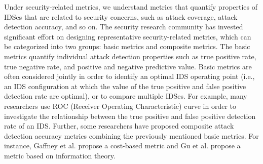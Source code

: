 Under security-related metrics, we understand metrics that quantify properties of IDSes that are related to security concerns, such as attack coverage, attack detection accuracy, and so on. The security research community has invested significant effort on designing representative security-related metrics, which can be categorized into two groups: basic metrics and composite metrics. The basic metrics quantify individual attack detection properties such as true positive rate, true negative rate, and positive and negative predictive value. Basic metrics are often considered jointly in order to identify an optimal IDS operating point (i.e., an IDS configuration at which the value of the true positive and false positive detection rate are optimal), or to compare multiple IDSes. For example, many researchers use ROC (Receiver Operating
Characteristic) curve in order to investigate the relationship
between the true positive and false positive detection rate
of an IDS. Further, some researchers have proposed composite attack detection accuracy metrics combining the previously mentioned basic metrics. For instance, Gaffney et al. \cite{gaffney:evaluation} propose a cost-based metric and Gu et al. \cite{gu:measuring} propose a metric based on information theory.  


